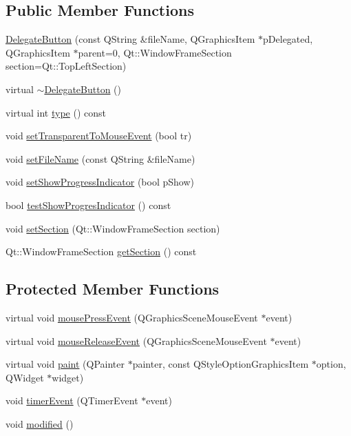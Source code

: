 \subsection*{Public Member Functions}
\begin{DoxyCompactItemize}
\item 
\hyperlink{class_delegate_button_acf1e882ae26f9bebef43dad6386239e9}{Delegate\-Button} (const Q\-String \&file\-Name, Q\-Graphics\-Item $\ast$p\-Delegated, Q\-Graphics\-Item $\ast$parent=0, Qt\-::\-Window\-Frame\-Section section=Qt\-::\-Top\-Left\-Section)
\item 
virtual \hyperlink{class_delegate_button_a0f410f94692ca47cf1e53226d5638ea7}{$\sim$\-Delegate\-Button} ()
\item 
virtual int \hyperlink{class_delegate_button_a0edc4043059338094e1383e2b6756638}{type} () const 
\item 
void \hyperlink{class_delegate_button_a733d2151598760d5f4c86f0f5b84c0ce}{set\-Transparent\-To\-Mouse\-Event} (bool tr)
\item 
void \hyperlink{class_delegate_button_ad19af21c9249e5a94865d2386668482a}{set\-File\-Name} (const Q\-String \&file\-Name)
\item 
void \hyperlink{class_delegate_button_a14b394c93e8478fe732bbe11071ffb3e}{set\-Show\-Progress\-Indicator} (bool p\-Show)
\item 
bool \hyperlink{class_delegate_button_ac04cedb91ed2c93815667b984e0a3ea8}{test\-Show\-Progres\-Indicator} () const 
\item 
void \hyperlink{class_delegate_button_aaf3246a5b2104d2de13dd6bbe366d7b5}{set\-Section} (Qt\-::\-Window\-Frame\-Section section)
\item 
Qt\-::\-Window\-Frame\-Section \hyperlink{class_delegate_button_ad7816ad8702609ec134d4d198c5b370a}{get\-Section} () const 
\end{DoxyCompactItemize}
\subsection*{Protected Member Functions}
\begin{DoxyCompactItemize}
\item 
virtual void \hyperlink{class_delegate_button_a2c591caf75e5e1319371da41a5248c8b}{mouse\-Press\-Event} (Q\-Graphics\-Scene\-Mouse\-Event $\ast$event)
\item 
virtual void \hyperlink{class_delegate_button_abb4b6d2f7f59ba770c0081b243218d40}{mouse\-Release\-Event} (Q\-Graphics\-Scene\-Mouse\-Event $\ast$event)
\item 
virtual void \hyperlink{class_delegate_button_adc5a62c8bc264b3d111c2c3f6b39ad2b}{paint} (Q\-Painter $\ast$painter, const Q\-Style\-Option\-Graphics\-Item $\ast$option, Q\-Widget $\ast$widget)
\item 
void \hyperlink{class_delegate_button_ab90305e2485e7a69ce2643ef1494f740}{timer\-Event} (Q\-Timer\-Event $\ast$event)
\item 
void \hyperlink{class_delegate_button_af0287f51da097f8fac14031fb94470a2}{modified} ()
\end{DoxyCompactItemize}


